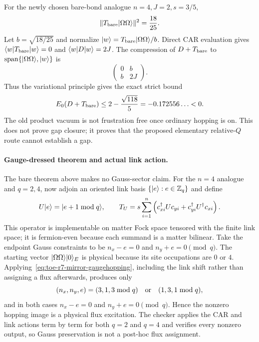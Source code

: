 For the newly chosen bare-bond analogue $n=4,J=2,s=3/5$,
\begin{equation}
 \|T_{\rm bare}|\Omega\Omega\rangle\|^2=\frac{18}{25}.
\end{equation}
Let $b=\sqrt{18/25}$ and normalize
$|w\rangle=T_{\rm bare}|\Omega\Omega\rangle/b$.  Direct CAR evaluation gives
$\langle w|T_{\rm bare}|w\rangle=0$ and $\langle w|D|w\rangle=2J$.  The compression of
$D+T_{\rm bare}$ to
$\operatorname{span}\{|\Omega\Omega\rangle,|w\rangle\}$ is
\begin{equation}
 \begin{pmatrix}0&b\\b&2J\end{pmatrix}.
\end{equation}
Thus the variational principle gives the exact strict bound
\begin{equation}
 E_0(D+T_{\rm bare})\leq
 2-\frac{\sqrt{118}}5=-0.172556\ldots<0.
 \label{eq:toe-r7-mirror-ritz}
\end{equation}
The old product vacuum is not frustration free once ordinary hopping is on.
This does not prove gap closure; it proves that the proposed elementary
relative-$Q$ route cannot establish a gap.

\paragraph{Gauge-dressed theorem and actual link action.}
The bare theorem above makes no Gauss-sector claim.  For the $n=4$ analogue
and $q=2,4$, now adjoin an oriented link basis
$\{|e\rangle:e\in\mathbb Z_q\}$ and define
\begin{equation}
 U|e\rangle=|e+1\bmod q\rangle,\qquad
 T_U=s\sum_{i=1}^n
 \left(c_{x i}^\dagger Uc_{y i}
 +c_{y i}^\dagger U^\dagger c_{x i}\right).
 \label{eq:toe-r7-mirror-gaugehopping}
\end{equation}
This operator is implementable on matter Fock space tensored with the finite
link space; it is fermion-even because each summand is a matter bilinear.
Take the endpoint Gauss constraints to be
$n_x-e=0$ and $n_y+e=0\pmod q$.  The starting vector
$|\Omega\Omega\rangle|0\rangle_E$ is physical because its site occupations are
$0$ or $4$.  Applying~\eqref{eq:toe-r7-mirror-gaugehopping}, including the link shift rather
than assigning a flux afterwards, produces only
\[
 (n_x,n_y,e)=(3,1,3\bmod q)\quad\hbox{or}\quad(1,3,1\bmod q),
\]
and in both cases $n_x-e=0$ and $n_y+e=0\pmod q$.  Hence the nonzero hopping
image is a physical flux excitation.  The checker applies the CAR and link
actions term by term for both $q=2$ and $q=4$ and verifies every nonzero output,
so Gauss preservation is not a post-hoc flux assignment.

